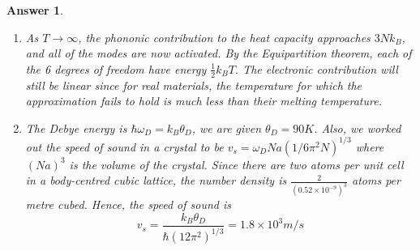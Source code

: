 \documentclass[a4paper]{article}
\newtheorem{ans}{Answer}[subsection]
\theoremstyle{new}
\begin{document}
\begin{ans}
\begin{enumerate}[label=(\roman*)]
\begin{itemize}
    $$C_{ph}=\frac{\partial U}{\partial T}\propto T^3$$
    \item Since electrons are fermions, they obey the Pauli Exclusion principle where no two electrons can be put in the same quantum state. We thus must have two electrons with anti-parallel spin in the same energy level. At temperature $T=0K$, the electrons will fill up the available momentum states and occupy a Fermi sphere in momentum space with radius $k_F$ (corresponding to a Fermi energy of $E_F$). If we slightly increase the energy of the system, the electrons deep in the sphere cannot gain energy, as the states (of slightly higher energy) that they would like to move to are already occupied. Hence, only those states within $~k_BT$ energy of the Fermi surface are able to absorb the energy. The number of states is the density of states at this energy multiplied by $k_BT$. Each of these states has $\frac{3}{2}k_BT$ of energy, hence the total electronic energy is $U_{el}~\frac{3}{2}k_BTg(E_F)k_BT$ and the electronic contribution to the heat capacity is
    $$C_{el}=\frac{\partial U_{el}}{\partial T}=3k_B^2g(E_F)T$$
    which is linear in $T$.
\end{itemize}
For any metal, the heat capacity will be a linear superposition of either contribution. The coefficients $\gamma$ and $\beta$ would be dependent on the crystal structure, hence material-dependent.
\item As $T\rightarrow\infty$, the phononic contribution to the heat capacity approaches $3Nk_B$, and all of the modes are now activated. By the Equipartition theorem, each of the 6 degrees of freedom have energy $\frac{1}{2}k_BT$. The electronic contribution will still be linear since for real materials, the temperature for which the approximation fails to hold is much less than their melting temperature.
\item The Debye energy is $\hbar\omega_D=k_B\theta_D$, we are given $\theta_D=90 K$. Also, we worked out the speed of sound in a crystal to be $v_s=\omega_DNa(1/6\pi^2N)^{1/3}$ where $(Na)^3$ is the volume of the crystal. Since there are two atoms per unit cell in a body-centred cubic lattice, the number density is $\frac{2}{(0.52\times10^{-9})^3}$ atoms per metre cubed. Hence, the speed of sound is
$$v_s=\frac{k_B\theta_D}{\hbar(12\pi^2)^{1/3}}=1.8\times10^3m/s$$


\end{enumerate}
\end{ans}
\newpage
\end{document}
